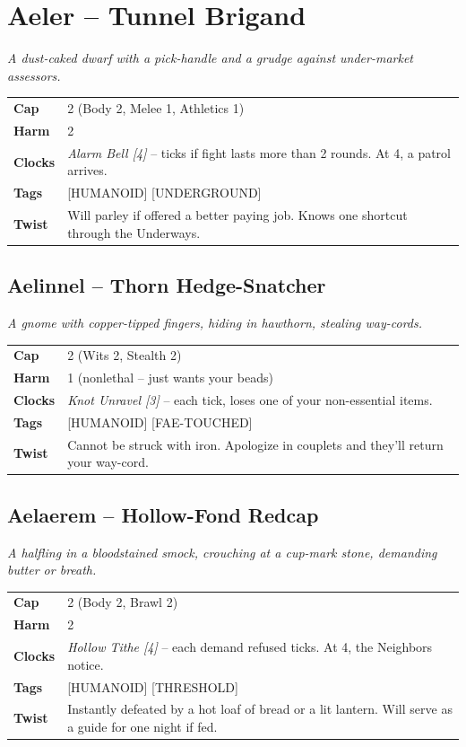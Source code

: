 \documentclass[10pt,twocolumn]{article}
\newcommand{\kw}[1]{\textbf{#1}}     %
\begin{document}
\section*{Aeler -- Tunnel Brigand}
\textit{A dust-caked dwarf with a pick-handle and a grudge against under-market assessors.}
\begin{tabular}{@{}ll}
\toprule
\kw{Cap} & 2 (Body 2, Melee 1, Athletics 1) \\
\kw{Harm} & 2 \\
\kw{Clocks} & \textit{Alarm Bell [4]} -- ticks if fight lasts more than 2 rounds. At 4, a patrol arrives. \\
\kw{Tags} & [HUMANOID] [UNDERGROUND] \\
\kw{Twist} & Will parley if offered a better paying job. Knows one shortcut through the Underways. \\
\bottomrule
\end{tabular}

\subsection*{Aelinnel -- Thorn Hedge-Snatcher}
\textit{A gnome with copper-tipped fingers, hiding in hawthorn, stealing way-cords.}
\begin{tabular}{@{}ll}
\toprule
\kw{Cap} & 2 (Wits 2, Stealth 2) \\
\kw{Harm} & 1 (nonlethal -- just wants your beads) \\
\kw{Clocks} & \textit{Knot Unravel [3]} -- each tick, loses one of your non-essential items. \\
\kw{Tags} & [HUMANOID] [FAE-TOUCHED] \\
\kw{Twist} & Cannot be struck with iron. Apologize in couplets and they'll return your way-cord. \\
\bottomrule
\end{tabular}

\subsection*{Aelaerem -- Hollow-Fond Redcap}
\textit{A halfling in a bloodstained smock, crouching at a cup-mark stone, demanding butter or breath.}
\begin{tabular}{@{}ll}
\toprule
\kw{Cap} & 2 (Body 2, Brawl 2) \\
\kw{Harm} & 2 \\
\kw{Clocks} & \textit{Hollow Tithe [4]} -- each demand refused ticks. At 4, the Neighbors notice. \\
\kw{Tags} & [HUMANOID] [THRESHOLD] \\
\kw{Twist} & Instantly defeated by a hot loaf of bread or a lit lantern. Will serve as a guide for one night if fed. \\
\bottomrule
\end{tabular}
\end{document}
